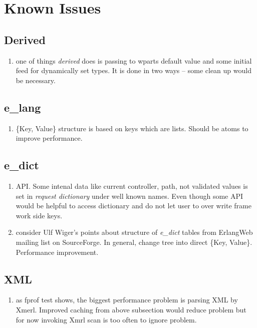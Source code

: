 \section{Known Issues}\label{knowniss}
\subsection{Derived}
\begin{enumerate}
\item one of things \emph{derived} does is passing to wparts default value and
  some initial feed for dynamically set types. It is done in two ways -- some
  clean up would be necessary.
\end{enumerate}

\subsection{e\_lang}
\begin{enumerate}
  \item \{Key, Value\} structure is based on keys which are lists. Should be atoms
  to improve performance.
\end{enumerate}

\subsection{e\_dict}
\begin{enumerate}
  \item API. Some intenal data like current controller, path, not validated
    values is set in \emph{request dictionary} under well known
    names. Even though some API would be helpful to access dictionary and do
    not let user to over write frame work side keys.
  \item consider Ulf Wiger's points about structure of \emph{e\_dict} tables
    from ErlangWeb mailing list on SourceForge. In general, change tree into
    direct \{Key, Value\}. Performance improvement. 
\end{enumerate}

\subsection{XML}
\begin{enumerate}
  \item as fprof test shows, the biggest performance problem is parsing XML by
    Xmerl. Improved caching from above subsection would reduce problem but for
    now invoking Xmrl scan is too often to ignore problem.   
\end{enumerate}

